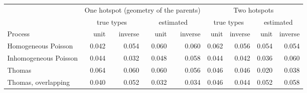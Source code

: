\begin{tabular}{@{}lrrrrrrrr@{}}
\toprule
 & \multicolumn{4}{c}{One hotspot (geometry of the parents)} & \multicolumn{4}{c}{Two hotspots} \\
\cmidrule(lr){2-5}\cmidrule(lr){6-9}
 & \multicolumn{2}{c}{true types} & \multicolumn{2}{c}{estimated} & \multicolumn{2}{c}{true types} & \multicolumn{2}{c}{estimated} \\
Process & unit & inverse & unit & inverse & unit & inverse & unit & inverse \\
\midrule
Homogeneous Poisson & 0.042 & 0.054 & 0.060 & 0.060 & 0.062 & 0.056 & 0.054 & 0.054 \\
Inhomogeneous Poisson & 0.044 & 0.032 & 0.048 & 0.058 & 0.044 & 0.042 & 0.036 & 0.060 \\
Thomas & 0.064 & 0.060 & 0.060 & 0.056 & 0.046 & 0.046 & 0.020 & 0.038 \\
Thomas, overlapping & 0.040 & 0.052 & 0.032 & 0.034 & 0.046 & 0.044 & 0.052 & 0.058 \\
\bottomrule
\end{tabular}
